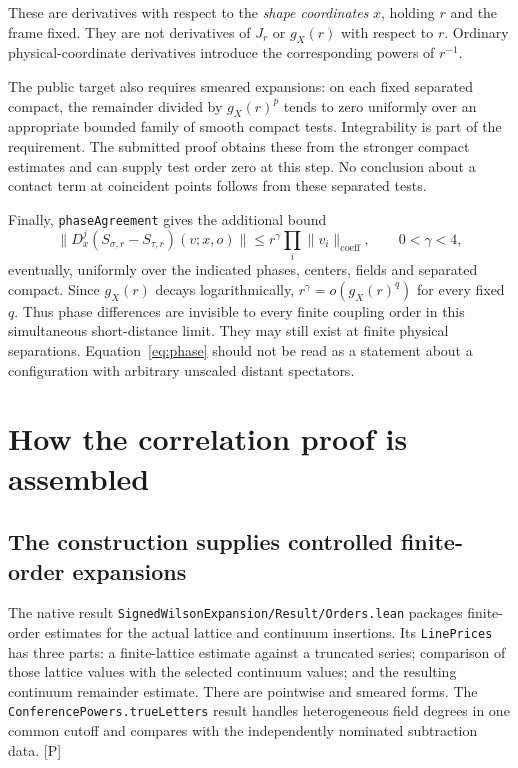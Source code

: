 \documentclass[11pt]{article}
\newcommand{\code}[1]{{\small\nolinkurl{#1}}}
\newcommand{\src}[1]{\textsf{[#1]}}
\begin{document}
These are derivatives with respect to the \emph{shape coordinates}
$x$, holding $r$ and the frame fixed. They are not derivatives of
$J_r$ or $g_X(r)$ with respect to $r$. Ordinary physical-coordinate
derivatives introduce the corresponding powers of $r^{-1}$.

The public target also requires smeared expansions: on each fixed
separated compact, the remainder divided by $g_X(r)^p$ tends to zero
uniformly over an appropriate bounded family of smooth compact tests.
Integrability is part of the requirement. The submitted proof obtains
these from the stronger compact estimates and can supply test order
zero at this step. No conclusion about a contact term at coincident
points follows from these separated tests.

Finally, \code{phaseAgreement} gives the additional bound
\begin{equation}\label{eq:phase}
 \|D_x^j(S_{\sigma,r}-S_{\tau,r})(v;x,o)\|
 \le r^\gamma\prod_i\|v_i\|_{\mathrm{coeff}},
 \qquad 0<\gamma<4,
\end{equation}
eventually, uniformly over the indicated phases, centers, fields and
separated compact. Since $g_X(r)$ decays logarithmically,
$r^\gamma=o(g_X(r)^q)$ for every fixed $q$. Thus phase differences
are invisible to every finite coupling order in this simultaneous
short-distance limit. They may still exist at finite physical
separations. Equation~\eqref{eq:phase} should not be read as a statement
about a configuration with arbitrary unscaled distant spectators.

\section{How the correlation proof is assembled}
\label{sec:proof}

\subsection{The construction supplies controlled finite-order expansions}

The native result \code{SignedWilsonExpansion/Result/Orders.lean}
packages finite-order estimates for the actual lattice and continuum
insertions. Its \code{LinePrices} has three parts: a finite-lattice
estimate against a truncated series; comparison of those lattice values
with the selected continuum values; and the resulting continuum
remainder estimate. There are pointwise and smeared forms. The
\code{ConferencePowers.trueLetters} result handles heterogeneous field
degrees in one common cutoff and compares with the independently
nominated subtraction data. \src{P}
\end{document}
